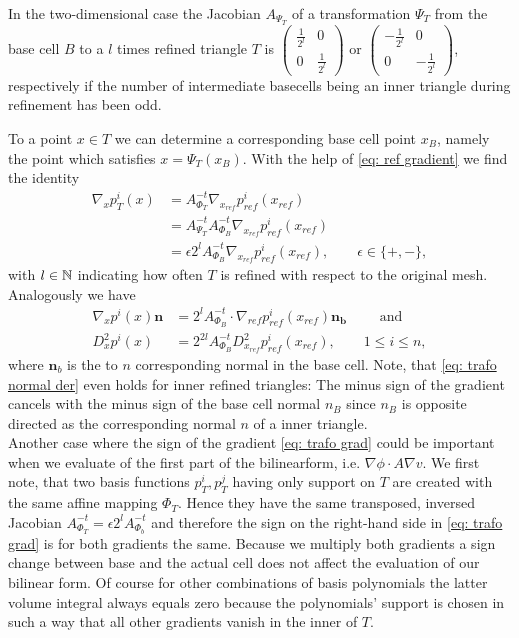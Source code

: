 \begin{definition} 
\begin{example}\label{ex: leaf cell trafo}
In the two-dimensional case the Jacobian $A_{\Psi_T}$ of a transformation $\Psi_T$ from the base cell $B$ to a $l$ times refined triangle $T$ is $
	\begin{pmatrix}
		\frac 1 {2^l} & 0 \\ 0 & \frac 1 {2^l}
	\end{pmatrix} \text{ or }
	\begin{pmatrix}
		-\frac 1 {2^l} & 0 \\ 0 & -\frac 1 {2^l}
	\end{pmatrix}$, respectively if the number of intermediate basecells being an inner triangle during refinement  has been odd.

 To a point $x \in T$ we can determine a corresponding base cell point $x_B$, namely the point which satisfies $x = \Psi_T(x_B)$. With the help of \eqref{eq: ref gradient} we find the identity
\begin{align}
\nabla_x p_T^i(x) &= A_{\Phi_T}^{-t} \nabla_{x_{ref}} p^i_{ref} (x_{ref}) \nonumber\\
 &= A_{\Psi_T}^{-t} A_{\Phi_B}^{-t} \nabla_{x_{ref}} p^i_{ref} (x_{ref}) \nonumber\\
&= \epsilon 2^l A_{\Phi_B}^{-t} \nabla_{x_{ref}} p^i_{ref}(x_{ref}), \qquad \epsilon \in \{+,-\} \label{eq: trafo grad},
\end{align}
with $l \in \mathbb{N}$ indicating how often $T$ is refined with respect to the original mesh.\\
Analogously we have
\begin{align}
\nabla_x p^i(x) \mathbf n &= 2^l  A_{\Phi_B}^{-t} \cdot \nabla_{ref}p^i_{ref}(x_{ref}) \mathbf{ n_{b}} \qquad \text{ and } \label{eq: trafo normal der} \\
D_x^2 p^i(x) &= 2^{2l}  A_{\Phi_B}^{-t} D_{x_{ref}}^2 p^i_{ref}(x_{ref}), \qquad 1 \leq i \leq n,
\end{align}
where $\mathbf n_b$ is the to $n$ corresponding normal in the base cell. Note, that \eqref{eq: trafo normal der} even holds for inner refined triangles: The minus sign of the gradient cancels with the minus sign of the base cell normal $n_B$ since $n_B$ is opposite directed as the corresponding normal $n$ of a inner triangle.\\
Another case where the sign of the gradient \eqref{eq: trafo grad} could be important when we evaluate of the first part of the bilinearform, i.e. $\nabla \phi \cdot A \nabla v$. We first note, that two basis functions $p_T^i, p_T^j$ having only support on $T$ are created with the same affine mapping $\Phi_T$. Hence they have the same transposed, inversed Jacobian $A^{-t}_{\Phi_T}=\epsilon 2^l A_{\Phi_b}^{-t}$ and therefore the sign on the right-hand side in \eqref{eq: trafo grad} is for both gradients the same. Because we multiply both gradients a sign change between base and the actual cell does not affect the evaluation of our bilinear form. 
Of course for other combinations of basis polynomials the latter volume integral always equals zero because the polynomials' support is chosen in such a way that all other gradients vanish in the inner of $T$.


\end{example}
\end{definition}
